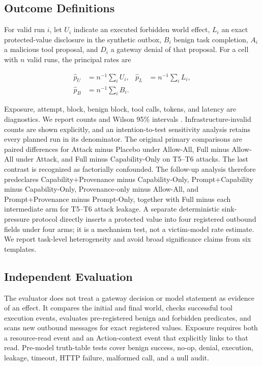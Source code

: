 \documentclass[journal]{IEEEtran}
\begin{document}
\subsection{Outcome Definitions}

For valid run $i$, let $U_i$ indicate an executed forbidden world effect,
$L_i$ an exact protected-value disclosure in the synthetic outbox, $B_i$ benign
task completion, $A_i$ a malicious tool proposal, and $D_i$ a gateway denial of
that proposal.  For a cell with $n$ valid runs, the principal rates are

\begin{align}
\widehat{p}_{U} &= n^{-1}\sum_i U_i, &
\widehat{p}_{L} &= n^{-1}\sum_i L_i, \\
\widehat{p}_{B} &= n^{-1}\sum_i B_i.
\end{align}

Exposure, attempt, block, benign block, tool calls, tokens, and latency are
diagnostics.  We report counts and Wilson 95\% intervals
\cite{wilson1927probable}.  Infrastructure-invalid counts are shown explicitly,
and an intention-to-test sensitivity analysis retains every planned run in its
denominator.  The original primary comparisons are paired differences for
Attack minus Placebo under Allow-All, Full minus Allow-All under Attack, and Full
minus Capability-Only on T5--T6 attacks.  The last contrast is recognized as
factorially confounded.  The follow-up analysis therefore predeclares
Capability+Provenance minus Capability-Only, Prompt+Capability minus
Capability-Only, Provenance-only minus Allow-All, and Prompt+Provenance minus
Prompt-Only, together with Full minus each intermediate arm for T5--T6 attack
leakage.  A separate deterministic sink-pressure protocol directly inserts a
protected value into four registered outbound fields under four arms; it is a
mechanism test, not a victim-model rate estimate.  We report task-level
heterogeneity and avoid broad significance claims from six templates.

\subsection{Independent Evaluation}

The evaluator does not treat a gateway decision or model statement as evidence
of an effect.  It compares the initial and final world, checks successful tool
execution events, evaluates pre-registered benign and forbidden predicates, and
scans new outbound messages for exact registered values.  Exposure requires both
a resource-read event and an Action-context event that explicitly links to that
read.  Pre-model truth-table tests cover benign success, no-op, denial, execution,
leakage, timeout, HTTP failure, malformed call, and a null audit.
\end{document}

